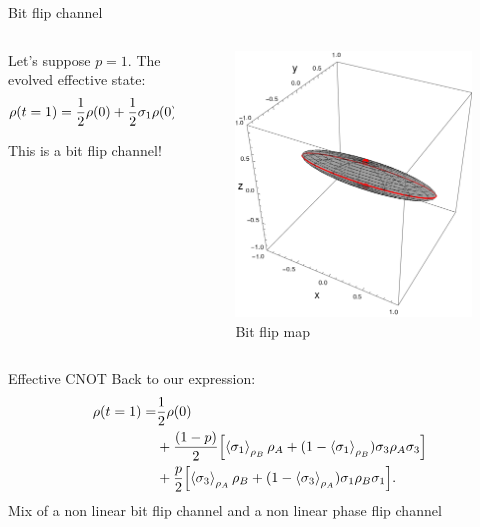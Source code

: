 \begin{frame}{Bit flip channel}
    \begin{columns}
        \begin{column}{0.5\textwidth}
            Let's suppose $p=1$. The evolved effective state:
            \begin{equation*}
              \rho(t=1)=\frac{1}{2}\rho(0)+\frac{1}{2}\sigma_{1}\rho(0)\sigma_{1}.
            \end{equation*}
        
            This is a bit flip channel!
        \end{column}
        \begin{column}{0.5\textwidth}
            \begin{figure}[h!]
                \centering
                \includegraphics[width=0.7\linewidth]{figures/sphere_BitF_t=1.0_z=0.8_p=0.6.png}
                \caption{Bit flip map}
                \label{fig:SWAPFactor2D}
              \end{figure}
        \end{column}
    \end{columns}
\end{frame}


\begin{frame}{Effective CNOT}
    Back to our expression:
    \begin{align*}
        \rho(t=1)=&\frac{1}{2}\rho(0)\\
        &+\frac{(1-p)}{2}\qty[\expval{\sigma_{1}}_{\rho_{B}}\rho_{A}+(1-\expval{\sigma_{1}}_{\rho_{B}})\sigma_{3}\rho_{A}\sigma_{3}]\\
        &+\frac{p}{2}\qty[\expval{\sigma_{3}}_{\rho_{A}}\rho_{B}+(1-\expval{\sigma_{3}}_{\rho_{A}})\sigma_{1}\rho_{B}\sigma_{1}].
    \end{align*}
    Mix of a non linear bit flip channel and a non linear phase flip channel
\end{frame}

